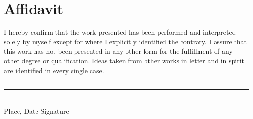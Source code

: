 \section*{Affidavit}
\vspace*{1.0cm}
I  hereby confirm that the  work  presented  has  been  performed  and interpreted solely by myself except for where I explicitly identified the contrary. I assure that this work has not been presented in any other form for the fulfillment of any other degree or qualification. Ideas taken from other works in letter and in spirit are identified in every single case.\\
\newline
\newline
\newline

\noindent

\rule{5.5cm}{0.4pt} \phantom{ssssssssssssssssspace} \rule{5.5cm}{0.4pt}\\
\phantom{space}Place, Date \phantom{sssssssssssssssssssssssssssssssssssssspace} Signature
